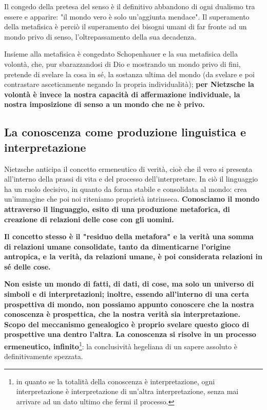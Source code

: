Il congedo della pretesa del senso è il definitivo abbandono di  ogni dualismo tra essere e apparire: "il mondo vero è solo un'aggiunta mendace". Il superamento della metafisica è perciò il superamento dei bisogni umani di far fronte ad un mondo privo di senso, l'oltrepassamento della sua decadenza.

Insieme alla metafisica è congedato Schopenhauer e la sua metafisica della volontà, che, pur sbarazzandosi di Dio e mostrando un mondo privo di fini, pretende di svelare la cosa in sé, la sostanza ultima del mondo (da svelare e poi contrastare asceticamente negando la propria individualità); \textbf{per Nietzsche la volontà è invece la nostra capacità di affermazione individuale, la nostra imposizione di senso a un mondo che ne è privo.}

\subsection{La conoscenza come produzione linguistica e interpretazione}

Nietzsche anticipa il concetto ermeneutico di verità, cioè che il vero si presenta all'interno della prassi di vita e del processo dell'interpretare. In ciò il linguaggio ha un ruolo decisivo, in quanto da forma stabile e consolidata al mondo: crea un'immagine che poi noi riteniamo proprietà intrinseca. \textbf{Conosciamo il mondo attraverso il linguaggio, esito di una produzione metaforica, di creazione di relazioni delle cose con gli uomini.}

\textbf{Il concetto stesso è il "residuo della metafora" e la verità una somma di relazioni umane consolidate, tanto da dimenticarne l'origine antropica, e la verità, da relazioni umane, è poi considerata relazioni in sé delle cose.}

\textbf{Non esiste un mondo di fatti, di dati, di cose, ma solo un universo di simboli e di interpretazioni; inoltre, essendo all'interno di una certa prospettiva di mondo, non possiamo appunto conoscere che la nostra conoscenza è prospettica, che la nostra verità sia interpretazione. Scopo del meccanismo genealogico è proprio svelare questo gioco di prospettive una dentro l'altra}. \textbf{La conoscenza si risolve in un processo ermeneutico, infinito}\footnote{in quanto se la totalità della conoscenza è interpretazione, ogni interpretazione è interpretazione di un'altra interpretazione, senza mai arrivare ad un dato ultimo che fermi il processo.}: la conclusività hegeliana di un sapere assoluto è definitivamente spezzata.

